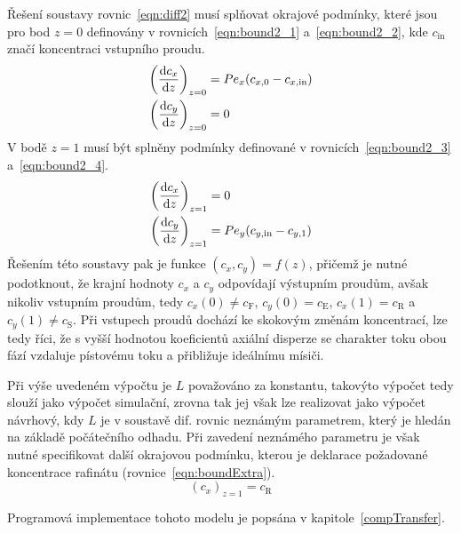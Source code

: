 Řešení soustavy rovnic~\ref{eqn:diff2} musí splňovat okrajové podmínky, které jsou pro bod $z=0$ definovány v rovnicích~\ref{eqn:bound2_1} a~\ref{eqn:bound2_2}, kde $c_\mathrm{in}$ značí koncentraci vstupního proudu.
\begin{align}
\label{eqn:bound2_1}
	\left( \frac{\mathrm{d} c_x}{\mathrm{d} z} \right)_{z=0} &= Pe_x (c_{x,0} - c_{x,\mathrm{in}}) \\
\label{eqn:bound2_2}
	\left( \frac{\mathrm{d} c_y}{\mathrm{d} z} \right)_{z=0} &= 0
\end{align}
V bodě $z=1$ musí být splněny podmínky definované v rovnicích~\ref{eqn:bound2_3} a~\ref{eqn:bound2_4}.
\begin{align}
\label{eqn:bound2_3}
	\left( \frac{\mathrm{d} c_x}{\mathrm{d} z} \right)_{z=1} &= 0 \\
\label{eqn:bound2_4}
	\left( \frac{\mathrm{d} c_y}{\mathrm{d} z} \right)_{z=1} &= Pe_y (c_{y,\mathrm{in}} - c_{y,1})
\end{align}
Řešením této soustavy pak je funkce $(c_x, c_y) = f(z)$, přičemž je nutné podotknout, že krajní hodnoty $c_x$ a $c_y$ odpovídají výstupním proudům, avšak nikoliv vstupním proudům, tedy $c_x(0) \neq c_\mathrm{F}$, $c_y(0) = c_\mathrm{E}$, $c_x(1) = c_\mathrm{R}$ a $c_y(1) \neq c_\mathrm{S}$. Při vstupech proudů dochází ke skokovým změnám koncentrací, lze tedy říci, že s vyšší hodnotou koeficientů axiální disperze se charakter toku obou fází vzdaluje pístovému toku a přibližuje ideálnímu mísiči.

Při výše uvedeném výpočtu je $L$ považováno za konstantu, takovýto výpočet tedy slouží jako výpočet simulační, zrovna tak jej však lze realizovat jako výpočet návrhový, kdy $L$ je v soustavě dif. rovnic neznámým parametrem, který je hledán na základě počátečního odhadu.
Při zavedení neznámého parametru je však nutné specifikovat další okrajovou podmínku, kterou je deklarace požadované koncentrace rafinátu (rovnice~\ref{eqn:boundExtra}).
\begin{equation}
\label{eqn:boundExtra}
	\left( c_x \right)_{z=1} = c_\mathrm{R}
\end{equation}

Programová implementace tohoto modelu je popsána v kapitole~\ref{compTransfer}.

